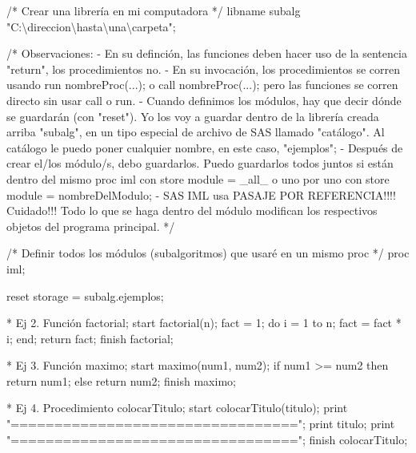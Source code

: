 \documentclass[
]{book}
\newenvironment{Shaded}{\begin{snugshade}}{\end{snugshade}}
\newcommand{\NormalTok}[1]{#1}
\begin{document}
\begin{Shaded}
\begin{Highlighting}[]
\NormalTok{/* Crear una librería en mi computadora */}
\NormalTok{libname subalg "C:\textbackslash{}direccion\textbackslash{}hasta\textbackslash{}una\textbackslash{}carpeta";}

\NormalTok{/* }
\NormalTok{Observaciones:}
\NormalTok{{-} En su definción, las funciones deben hacer uso de la sentencia "return", }
\NormalTok{  los procedimientos no.}
\NormalTok{{-} En su invocación, los procedimientos se corren usando run nombreProc(...); }
\NormalTok{  o call nombreProc(...); pero las funciones se corren directo sin usar call o run.}
\NormalTok{{-} Cuando definimos los módulos, hay que decir dónde se guardarán (con "reset"). Yo los voy a}
\NormalTok{  guardar dentro de la librería creada arriba "subalg", en un tipo especial de archivo}
\NormalTok{  de SAS llamado "catálogo". Al catálogo le puedo poner cualquier nombre, en este caso, "ejemplos";}
\NormalTok{{-} Después de crear el/los módulo/s, debo guardarlos. Puedo guardarlos todos juntos si están}
\NormalTok{  dentro del mismo proc iml con store module = \_all\_ o uno por uno con store module = nombreDelModulo;}
\NormalTok{{-} SAS IML usa PASAJE POR REFERENCIA!!!! Cuidado!!! Todo lo que se haga dentro del módulo }
\NormalTok{  modifican los respectivos objetos del programa principal.}
\NormalTok{*/}

\NormalTok{/* Definir todos los módulos (subalgoritmos) que usaré en un mismo proc */}
\NormalTok{proc iml;}

\NormalTok{    reset storage = subalg.ejemplos;}

\NormalTok{    * Ej 2. Función factorial;}
\NormalTok{    start factorial(n);}
\NormalTok{        fact = 1;}
\NormalTok{        do i = 1 to n;}
\NormalTok{            fact = fact * i;}
\NormalTok{        end;}
\NormalTok{        return fact;}
\NormalTok{    finish factorial;}

\NormalTok{    * Ej 3. Función maximo;}
\NormalTok{    start maximo(num1, num2);}
\NormalTok{        if num1 \textgreater{}= num2 then return num1;}
\NormalTok{        else return num2;}
\NormalTok{    finish maximo;}

\NormalTok{    * Ej 4. Procedimiento colocarTitulo;}
\NormalTok{    start colocarTitulo(titulo);}
\NormalTok{        print "=================================";}
\NormalTok{        print titulo;}
\NormalTok{        print "=================================";}
\NormalTok{    finish colocarTitulo;}
    

\end{Highlighting}
\end{Shaded}
\end{document}

